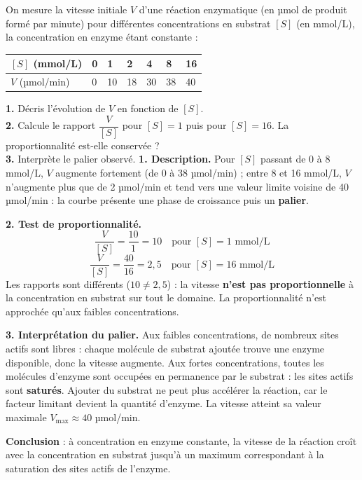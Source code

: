 \documentclass[11pt]{article}
\begin{document}
\begin{exoresolu}
On mesure la vitesse initiale $V$ d'une réaction enzymatique (en µmol de produit formé par minute) pour différentes concentrations en substrat $[S]$ (en mmol/L), la concentration en enzyme étant constante :

\begin{center}
\begin{tabularx}{\linewidth}{|l|X|X|X|X|X|X|}\hline
\rowcolor{popblueL}
$[S]$ (mmol/L) & 0 & 1 & 2 & 4 & 8 & 16 \\ \hline
$V$ (µmol/min) & 0 & 10 & 18 & 30 & 38 & 40 \\ \hline
\end{tabularx}
\end{center}

\textbf{1.} Décris l'évolution de $V$ en fonction de $[S]$.\\
\textbf{2.} Calcule le rapport $\dfrac{V}{[S]}$ pour $[S] = 1$ puis pour $[S] = 16$. La proportionnalité est-elle conservée ?\\
\textbf{3.} Interprète le palier observé.
\tcblower
\textbf{1. Description.} Pour $[S]$ passant de 0 à 8 mmol/L, $V$ augmente fortement (de 0 à 38 µmol/min) ; entre 8 et 16 mmol/L, $V$ n'augmente plus que de 2 µmol/min et tend vers une valeur limite voisine de 40 µmol/min : la courbe présente une phase de croissance puis un \textbf{palier}.

\textbf{2. Test de proportionnalité.}
\[ \frac{V}{[S]} = \frac{10}{1} = 10 \quad \text{pour } [S] = 1 \text{ mmol/L} \]
\[ \frac{V}{[S]} = \frac{40}{16} = 2{,}5 \quad \text{pour } [S] = 16 \text{ mmol/L} \]
Les rapports sont différents ($10 \neq 2{,}5$) : la vitesse \textbf{n'est pas proportionnelle} à la concentration en substrat sur tout le domaine. La proportionnalité n'est approchée qu'aux faibles concentrations.

\textbf{3. Interprétation du palier.} Aux faibles concentrations, de nombreux sites actifs sont libres : chaque molécule de substrat ajoutée trouve une enzyme disponible, donc la vitesse augmente. Aux fortes concentrations, toutes les molécules d'enzyme sont occupées en permanence par le substrat : les sites actifs sont \textbf{saturés}. Ajouter du substrat ne peut plus accélérer la réaction, car le facteur limitant devient la quantité d'enzyme. La vitesse atteint sa valeur maximale $V_{\max} \approx 40$ µmol/min.

\textbf{Conclusion} : à concentration en enzyme constante, la vitesse de la réaction croît avec la concentration en substrat jusqu'à un maximum correspondant à la saturation des sites actifs de l'enzyme.
\end{exoresolu}
\end{document}
